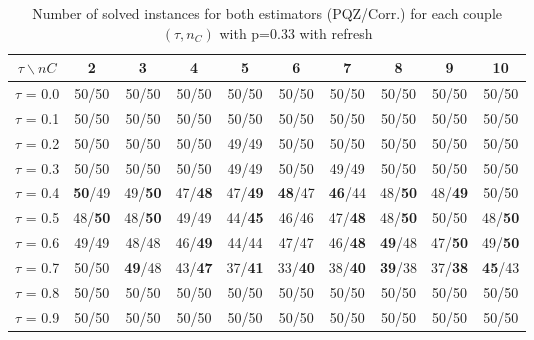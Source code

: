 \begin{table}[H]
\centering

\begin{tabular}{|c|c|c|c|c|c|c|c|c|c|}
\hline
$\tau \backslash nC$ & 2 & 3 & 4 & 5 & 6 & 7 & 8 & 9 & 10 \\
\hline
$\tau$ = 0.0 & 50/50 & 50/50 & 50/50 & 50/50 & 50/50 & 50/50 & 50/50 & 50/50 & 50/50 \\
\hline
$\tau$ = 0.1 & 50/50 & 50/50 & 50/50 & 50/50 & 50/50 & 50/50 & 50/50 & 50/50 & 50/50 \\
\hline
$\tau$ = 0.2 & 50/50 & 50/50 & 50/50 & 49/49 & 50/50 & 50/50 & 50/50 & 50/50 & 50/50 \\
\hline
$\tau$ = 0.3 & 50/50 & 50/50 & 50/50 & 49/49 & 50/50 & 49/49 & 50/50 & 50/50 & 50/50 \\
\hline
$\tau$ = 0.4 & \textbf{50}/49 & 49/\textbf{50} & 47/\textbf{48} & 47/\textbf{49} & \textbf{48}/47 & \textbf{46}/44 & 48/\textbf{50} & 48/\textbf{49} & 50/50 \\
\hline
$\tau$ = 0.5 & 48/\textbf{50} & 48/\textbf{50} & 49/49 & 44/\textbf{45} & 46/46 & 47/\textbf{48} & 48/\textbf{50} & 50/50 & 48/\textbf{50} \\
\hline
$\tau$ = 0.6 & 49/49 & 48/48 & 46/\textbf{49} & 44/44 & 47/47 & 46/\textbf{48} & \textbf{49}/48 & 47/\textbf{50} & 49/\textbf{50} \\
\hline
$\tau$ = 0.7 & 50/50 & \textbf{49}/48 & 43/\textbf{47} & 37/\textbf{41} & 33/\textbf{40} & 38/\textbf{40} & \textbf{39}/38 & 37/\textbf{38} & \textbf{45}/43 \\
\hline
$\tau$ = 0.8 & 50/50 & 50/50 & 50/50 & 50/50 & 50/50 & 50/50 & 50/50 & 50/50 & 50/50 \\
\hline
$\tau$ = 0.9 & 50/50 & 50/50 & 50/50 & 50/50 & 50/50 & 50/50 & 50/50 & 50/50 & 50/50 \\
\hline
\end{tabular}


~	\caption{Number of solved instances for both estimators (PQZ/Corr.) for each couple $(\tau, n_C)$ with p=0.33 with refresh}
    \label{nbSolved033Refresh}
\end{table}
